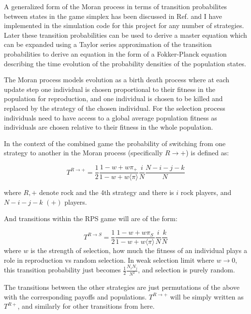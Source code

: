 \documentclass[%
 reprint,
 amsmath,amssymb,
 aps,
]{revtex4-2}
\begin{document}
A generalized form of the Moran process in terms of transition probabilites between states in the 
game simplex has been discussed in Ref.\cite{general_moran_process} and I have implemented in the
simulation code for this project for any number of strategies. Later these transition probabilities can be used to derive a master equation \cite{alma9933506044604871} which 
can be expanded using a Taylor series approximation of the transition probabilities to derive an equation in the form of a Fokker-Planck equation
describing the time evolution of the probability densities of the population states.

The Moran process models evolution as a birth death process where at each update step
one individual is chosen proportional to their fitness in the population for 
reproduction, and one individual is chosen to be killed and replaced by the
strategy of the chosen individual. For the selection process individuals need to have
access to a global average population fitness as individuals are chosen 
relative to their fitness in the whole population. 

In the context of the combined game the probability of switching from one strategy
to another in the Moran process (specifically $R \rightarrow +$) is defined as:

\begin{equation}
    T^{R \rightarrow +} = \frac{1}{2} \frac{1 - w + w \pi_+}{1 - w + w \langle \pi \rangle} \frac{i}{N} \frac{N - i - j - k}{N}
\end{equation}

where $R,+$ denote rock and the 4th strategy and there is $i$ rock players, 
and $N-i-j-k$ $(+)$ players.

And transitions within the RPS game will are of the form:

\begin{equation}
    T^{R \rightarrow S} = \frac{1}{2} \frac{1 - w + w \pi_S}{1 - w + w \langle \pi \rangle} \frac{i}{N} \frac{k}{N}
\end{equation}  
where $w$ is the strength of selection, how much the fitness of an individual 
plays a role in reproduction vs random selection. In weak selection 
limit where $w \rightarrow 0$, this transition probability just becomes 
$\frac{1}{2}\frac{N_i N_j}{N^2}$, and selection is purely random.

The transitions between the other strategies are just permutations of the above
with the corresponding payoffs and populations. $T^{R \rightarrow +}$ will be 
simply written as $T^{R+}$, and similarly for other transitions from here.
\end{document}
